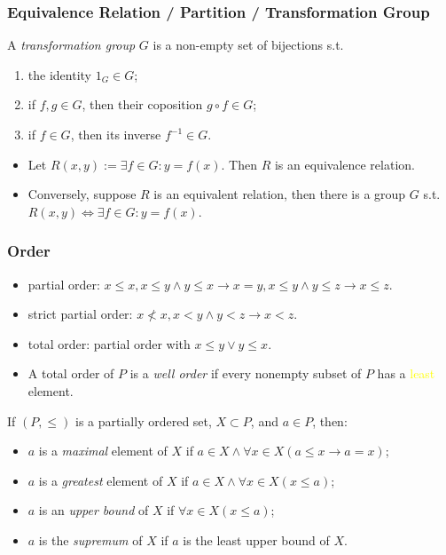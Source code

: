 \documentclass[UTF8,aspectratio=43,11pt,colorlinks,compress,openany]{beamer}%
\begin{document}
\begin{frame}\frametitle{Equivalence Relation / Partition / Transformation Group}
\begin{definition}
A \emph{transformation group} $G$ is a non-empty set of bijections s.t.
\begin{enumerate}
	\item the identity $1_G\in G$;
	\item if $f,g\in G$, then their coposition $g\circ f\in G$;
	\item if $f\in G$, then its inverse $f^{-1}\in G$.
\end{enumerate}
\end{definition}
\begin{itemize}
	\item Let $R(x,y):=\exists f\in G: y=f(x)$. Then $R$ is an equivalence relation.
	\item Conversely, suppose $R$ is an equivalent relation, then there is a group $G$ s.t. $R(x,y)\iff \exists f\in G: y=f(x)$.
\end{itemize}
\end{frame}

\begin{frame}\frametitle{Order}
	\begin{itemize}
		\item partial order: $x\leq x, x\leq y\wedge y\leq x\to x=y, x\leq y\wedge y\leq z\to x\leq z$.
		\item strict partial order: $x\not< x, x< y\wedge y<z\to x<z$.
		\item total order: partial order with $x\leq y\vee y\leq x$.
		\item A total order of $P$ is a \emph{well order} if every nonempty subset of $P$ has a \textcolor{yellow}{least} element.
	\end{itemize}
	\begin{definition}
		If $(P,\leq)$ is a partially ordered set, $X\subset P$, and $a\in P$, then:
		\begin{itemize}
			\item $a$ is a \emph{maximal} element of $X$ if $a\in X\wedge\forall x\in X(a\leq x\to a=x)$;
			\item $a$ is a \emph{greatest} element of $X$ if $a\in X\wedge\forall x\in X(x\leq a)$;
			\item $a$ is an \emph{upper bound} of $X$ if $\forall x\in X(x\leq a)$;
			\item $a$ is the \emph{supremum} of $X$ if $a$ is the least upper bound of $X$.
		\end{itemize}
	\end{definition}
\end{frame}
\end{document}
